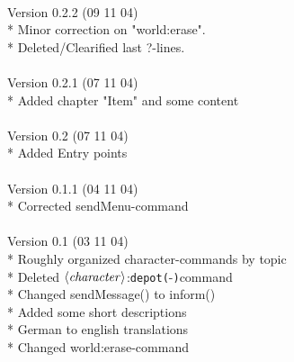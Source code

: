 \documentclass[a4paper,10pt,makeidx]{scrreprt}
\newcommand{\com}[2]{\index{#1}\texttt{#1(}#2\texttt{)}}
\newcommand{\var}[1]{$\left\langle \text{\emph{#1}} \right\rangle$}
\begin{document}
\\
Version 0.2.2 (09 11 04)\\
* Minor correction on "world:erase".\\
* Deleted/Clearified last ?-lines.\\
\\
Version 0.2.1 (07 11 04)\\
* Added chapter "Item" and some content\\
\\
Version 0.2 (07 11 04)\\
* Added Entry points\\
\\
Version 0.1.1 (04 11 04)\\
* Corrected sendMenu-command\\
\\
Version 0.1 (03 11 04)\\
* Roughly organized character-commands by topic\\
* Deleted \var{character}:\com{depot}-command\\
* Changed sendMessage() to inform()\\
* Added some short descriptions\\
* German to english translations\\
* Changed world:erase-command

\printindex
\end{document}
